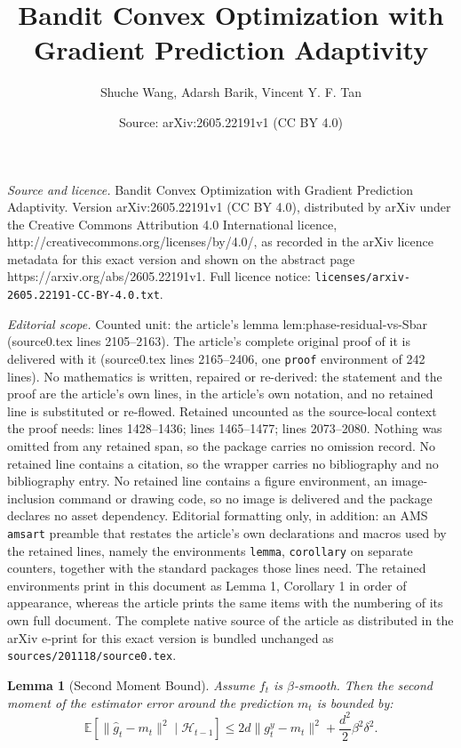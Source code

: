 \documentclass[10pt,a4paper]{amsart}
\title{Bandit Convex Optimization with Gradient Prediction Adaptivity}
\author{Shuche Wang, Adarsh Barik, Vincent Y. F. Tan}
\date{Source: arXiv:2605.22191v1 (CC BY 4.0)}
\newtheorem{lemma}{Lemma}
\begin{document}
\maketitle

\noindent\emph{Source and licence.} Bandit Convex Optimization with Gradient Prediction Adaptivity. Version arXiv:2605.22191v1 (CC BY 4.0), distributed by arXiv under the Creative Commons Attribution 4.0 International licence, http://creativecommons.org/licenses/by/4.0/, as recorded in the arXiv licence metadata for this exact version and shown on the abstract page https://arxiv.org/abs/2605.22191v1. Full licence notice: \texttt{licenses/arxiv-2605.22191-CC-BY-4.0.txt}.\par\smallskip

\noindent\textit{Editorial scope.} Counted unit: the article's lemma lem:phase-residual-vs-Sbar (source0.tex lines 2105--2163). The article's complete original proof of it is delivered with it (source0.tex lines 2165--2406, one \texttt{proof} environment of 242 lines). No mathematics is written, repaired or re-derived: the statement and the proof are the article's own lines, in the article's own notation, and no retained line is substituted or re-flowed.  Retained uncounted as the source-local context the proof needs: lines 1428--1436; lines 1465--1477; lines 2073--2080.  Nothing was omitted from any retained span, so the package carries no omission record.  No retained line contains a citation, so the wrapper carries no bibliography and no bibliography entry.  No retained line contains a figure environment, an image-inclusion command or drawing code, so no image is delivered and the package declares no asset dependency.  Editorial formatting only, in addition: an AMS \texttt{amsart} preamble that restates the article's own declarations and macros used by the retained lines, namely the environments \texttt{lemma}, \texttt{corollary} on separate counters, together with the standard packages those lines need.  The retained environments print in this document as Lemma 1, Corollary 1 in order of appearance, whereas the article prints the same items with the numbering of its own full document.  The complete native source of the article as distributed in the arXiv e-print for this exact version is bundled unchanged as \texttt{sources/201118/source0.tex}.
\begin{lemma}[Second Moment Bound]
    \label{lem:second-moment-center} Assume $f_{t}$ is $\beta$-smooth. Then the
    second moment of the estimator error around the prediction $m_{t}$ is
    bounded by:
    \begin{equation*}
        \mathbb{E}\left[\|\hat g_{t}-m_{t}\|^{2}\mid \mathcal{H}_{t-1}\right]\le
        2d\|g_{t}^{y}-m_{t}\|^{2}+ \frac{d^{2}}{2}\beta^{2}\delta^{2}.
    \end{equation*}
\end{lemma}
\end{document}
